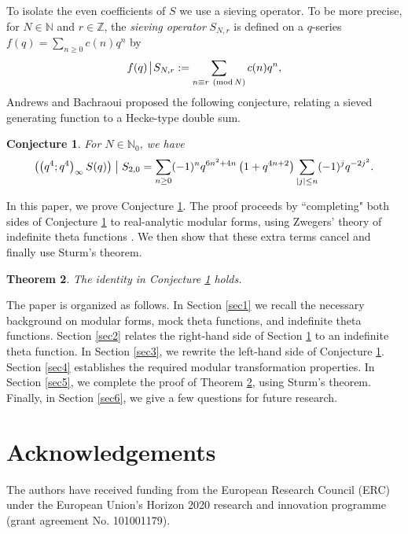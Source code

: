 \documentclass[12pt,reqno]{amsart}
\renewcommand{\(}{\left\(}
\renewcommand{\)}{\right\)}
\numberwithin{equation}{section}
\theoremstyle{plain}
\newtheorem{theorem}{Theorem}[section]
\newtheorem{conjecture}[theorem]{Conjecture}
\theoremstyle{definition}
\numberwithin{equation}{section}
\newcommand{\kbf}{\bf\color{green!40!black!60!}}
\renewcommand{\pmod}[1]{\ \left( \mathrm{mod} \, #1 \right)}
\begin{document}
To isolate the even coefficients of $S$ we use a sieving operator. To be more precise, for $N\in \mathbb{N}$ and $r\in \mathbb{Z}$, the {\it sieving operator} $S_{N,r}$ is defined on a $q$-series $f(q)=\sum_{n\ge 0} c(n)q^n$ by
\[
f(q)\!\bigm|\!S_{N,r}:=\sum_{n\equiv r\pmod N}c(n) q^n,
\]
Andrews and Bachraoui \cite[Conjecture 4]{AB} proposed the following conjecture, relating a sieved generating function to a Hecke-type double sum.
\begin{conjecture}\label{ABConj3}
	For $N\in \mathbb{N}_0$, we have 
	\begin{align*}
	\left(\left(q^4;q^4\right)_{\infty}S(q)\right)\bigm| S_{2,0}=\sum_{n\ge 0}(-1)^nq^{6n^2+4n}\left(1+q^{4n+2}\right)\sum_{|j|\le n}(-1)^{j}q^{-2j^2}.
	\end{align*}
\end{conjecture}

In this paper, we prove Conjecture \ref{ABConj3}. The proof proceeds by ``completing" both sides of Conjecture \ref{ABConj3} to real-analytic modular forms, using Zwegers' theory of indefinite theta functions \cite{Zw}. We then show that these extra terms cancel and finally use Sturm's theorem. %
\begin{theorem}\label{BBthm}
The identity in Conjecture \ref{ABConj3} holds.
\end{theorem}





The paper is organized as follows. In Section \ref{sec1} we recall the necessary background on modular forms, mock theta functions, and indefinite theta functions. Section \ref{sec2} relates the right-hand side of Section \ref{ABConj3} to an indefinite theta function. In Section \ref{sec3}, we rewrite the left-hand side of Conjecture \ref{ABConj3}. Section \ref{sec4} establishes the required modular transformation properties. In Section \ref{sec5}, we complete the proof of Theorem \ref{BBthm}, using Sturm's theorem. Finally, in Section \ref{sec6}, we give a few questions for future research.



\section*{Acknowledgements}
The authors have received funding from the European Research Council (ERC) under the European Union's Horizon 2020 research and innovation programme (grant agreement No. 101001179).
\end{document}
